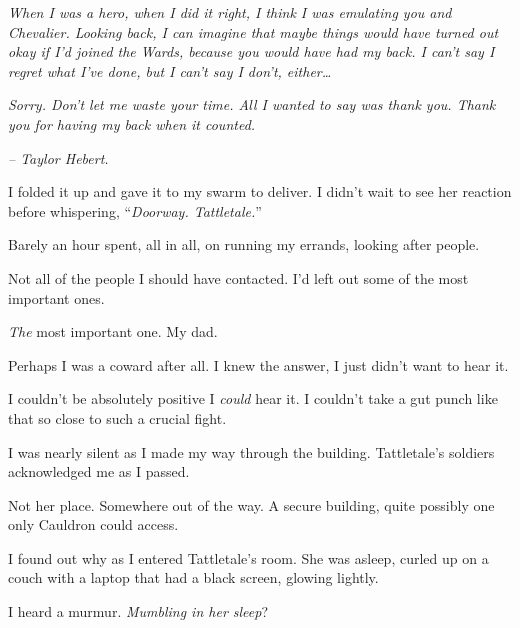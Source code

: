 \emph{When I was a hero, when I did it right, I think I was emulating you and Chevalier.  Looking back, I can imagine that maybe things would have turned out okay if I'd joined the Wards, because you would have had my back.  I can't say I regret what I've done, but I can't say I don't, either\ldots}



\emph{Sorry.  Don't let me waste your time.  All I wanted to say was thank you.  Thank you for having my back when it counted.}



\emph{– Taylor Hebert.}



I folded it up and gave it to my swarm to deliver.  I didn't wait to see her reaction before whispering, ``\emph{Doorway.  Tattletale.}''



\sectionbreak



Barely an hour spent, all in all, on running my errands, looking after people.



Not all of the people I should have contacted.  I'd left out some of the most important ones.



\emph{The }most important one.  My dad.



Perhaps I was a coward after all.  I knew the answer, I just didn't want to hear it.



I couldn't be absolutely positive I \emph{could} hear it.  I couldn't take a gut punch like that so close to such a crucial fight.



I was nearly silent as I made my way through the building.  Tattletale's soldiers acknowledged me as I passed.



Not her place.  Somewhere out of the way.  A secure building, quite possibly one only Cauldron could access.



I found out why as I entered Tattletale's room.  She was asleep, curled up on a couch with a laptop that had a black screen, glowing lightly.



I heard a murmur.  \emph{Mumbling in her sleep}?



